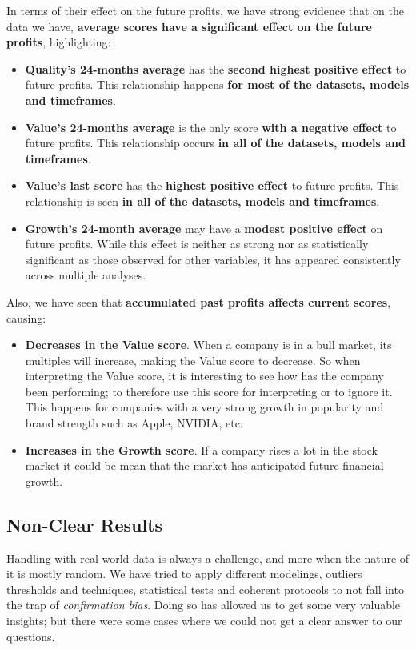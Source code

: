 \documentclass[11pt,english,a4paper,hidelinks]{book}
\begin{document}
\noindent In terms of their effect on the future profits, we have strong evidence that on the data we have, \textbf{average scores have a significant effect on the future profits}, highlighting:
\begin{itemize}
    \item \textbf{Quality's 24-months average} has the \textbf{second highest positive effect} to future profits. This relationship happens \textbf{for most of the datasets, models and timeframes}.
    \item \textbf{Value's 24-months average} is the only score \textbf{with a negative effect} to future profits. This relationship occurs \textbf{in all of the datasets, models and timeframes}.
    \item \textbf{Value's last score} has the \textbf{highest positive effect} to future profits. This relationship is seen \textbf{in all of the datasets, models and timeframes}.
    \item \textbf{Growth's 24-month average} may have a \textbf{modest positive effect} on future profits. While this effect is neither as strong nor as statistically significant as those observed for other variables, it has appeared consistently across multiple analyses.
\end{itemize}

\noindent Also, we have seen that \textbf{accumulated past profits affects current scores}, causing:
\begin{itemize}
    \item \textbf{Decreases in the Value score}. When a company is in a bull market, its multiples will increase, making the Value score to decrease. So when interpreting the Value score, it is interesting to see how has the company been performing; to therefore use this score for interpreting or to ignore it. This happens for companies with a very strong growth in popularity and brand strength such as Apple, NVIDIA, etc.
    \item \textbf{Increases in the Growth score}. If a company rises a lot in the stock market it could be mean that the market has anticipated future financial growth.
\end{itemize}

\subsection{Non-Clear Results}

\noindent Handling with real-world data is always a challenge, and more when the nature of it is mostly random. We have tried to apply different modelings, outliers thresholds and techniques, statistical tests and coherent protocols to not fall into the trap of \textit{confirmation bias}. Doing so has allowed us to get some very valuable insights; but there were some cases where we could not get a clear answer to our questions.
\end{document}
